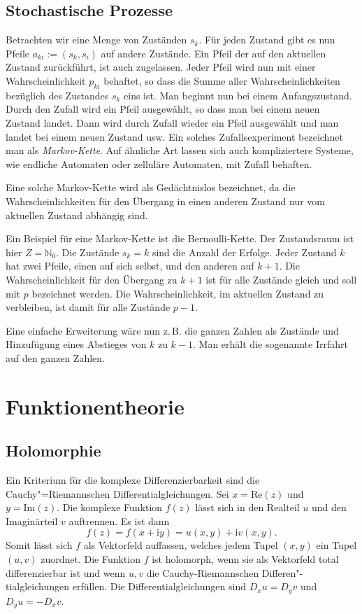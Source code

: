 \documentclass[a4paper,10pt,fleqn,twocolumn,twoside]{article}
\numberwithin{equation}{section}
\newcommand{\ui}{\mathrm i}
\begin{document}
\subsection{Stochastische Prozesse}
Betrachten wir eine Menge von Zuständen $s_k$. Für jeden
Zustand gibt es nun Pfeile $a_{ki}:=(s_k,s_i)$ auf andere Zustände.
Ein Pfeil der auf den aktuellen Zustand zurückführt, ist auch
zugelassen. Jeder Pfeil wird nun mit einer Wahrscheinlichkeit
$p_{ki}$ behaftet, so dass die Summe aller Wahrscheinlichkeiten
bezüglich des Zustandes $s_k$ eins ist. Man beginnt nun bei einem
Anfangszustand. Durch den Zufall wird ein Pfeil ausgewählt, so dass
man bei einem neuen Zustand landet. Dann wird durch Zufall wieder
ein Pfeil ausgewählt und man landet bei einem neuen Zustand usw.
Ein solches Zufallsexperiment bezeichnet man als
\textit{Markov-Kette}. Auf ähnliche Art lassen sich auch
kompliziertere Systeme, wie endliche Automaten oder zelluläre
Automaten, mit Zufall behaften.

Eine solche Markov-Kette wird als Gedächtnislos bezeichnet, da
die Wahrscheinlichkeiten für den Übergang in einen anderen Zustand
nur vom aktuellen Zustand abhängig sind.

Ein Beispiel für eine Markov-Kette ist die Bernoulli-Kette.
Der Zustandsraum ist hier $Z=\mathbb{N}_0$. Die Zustände $s_k=k$
sind die Anzahl der Erfolge. Jeder Zustand $k$ hat zwei Pfeile,
einen auf sich selbst, und den anderen auf $k+1$. Die
Wahrscheinlichkeit für den Übergang zu $k+1$ ist für alle Zustände
gleich und soll mit $p$ bezeichnet werden. Die Wahrscheinlichkeit,
im aktuellen Zustand zu verbleiben, ist damit für alle
Zustände $p-1$.

Eine einfache Erweiterung wäre nun z.\,B. die ganzen Zahlen als
Zustände und Hinzufügung eines Abstieges von $k$ zu $k-1$.
Man erhält die sogenannte Irrfahrt auf den ganzen Zahlen.


\newpage
\section{Funktionentheorie}
\subsection{Holomorphie}

Ein Kriterium für die komplexe Differenzierbarkeit sind die
Cauchy"=Riemannschen Differentialgleichungen. Sei $x=\mathrm{Re}(z)$
und $y=\mathrm{Im}(z)$. Die komplexe Funktion $f(z)$ lässt sich
in den Realteil $u$ und den Imaginärteil $v$ auftrennen. Es ist
dann
\begin{equation}
f(z) = f(x+\ui y) = u(x,y)+\ui v(x,y).
\end{equation}
Somit lässt sich $f$ als Vektorfeld auffassen, welches jedem Tupel
$(x,y)$ ein Tupel $(u,v)$ zuordnet. Die Funktion $f$ ist
holomorph, wenn sie als Vektorfeld total differenzierbar ist und
wenn $u,v$ die Cauchy-Riemannschen Differen"-tialgleichungen
erfüllen. Die Differentialgleichungen sind $D_x u=D_y v$ und
$D_y u = -D_x v$.
\end{document}

